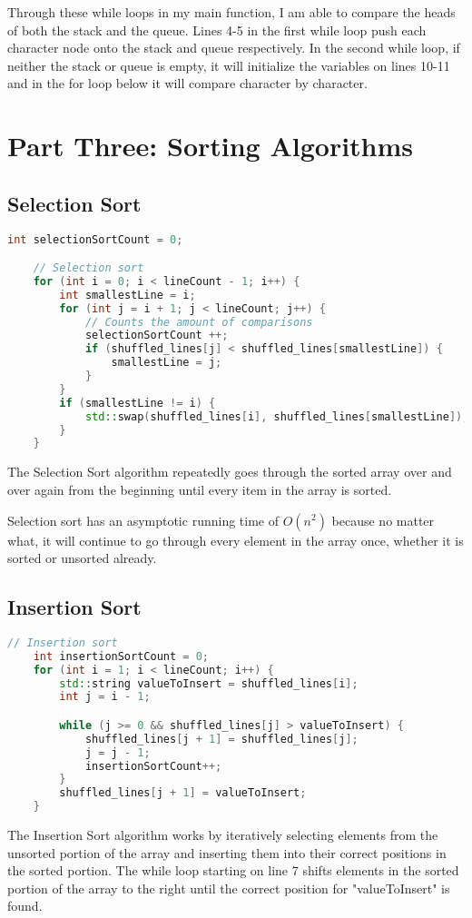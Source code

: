 \documentclass[letterpaper, 10pt,DIV=13]{scrartcl}
\numberwithin{equation}{section} %
\numberwithin{figure}{section} %
\numberwithin{table}{section} %
\begin{document}
Through these while loops in my main function, I am able to compare the heads of both the stack and the queue. Lines 4-5 in the first while loop push each character node onto the stack and queue respectively. In the second while loop, if neither the stack or queue is empty, it will initialize the variables on lines 10-11 and in the for loop below it will compare character by character.

\pagebreak

\section{Part Three: Sorting Algorithms}
\subsection{Selection Sort}
\begin{lstlisting}[language=c++, caption= Selection Sort Algorithm]
    int selectionSortCount = 0;

    // Selection sort
    for (int i = 0; i < lineCount - 1; i++) {
        int smallestLine = i;
        for (int j = i + 1; j < lineCount; j++) {
            // Counts the amount of comparisons
            selectionSortCount ++;
            if (shuffled_lines[j] < shuffled_lines[smallestLine]) {
                smallestLine = j;
            }
        }
        if (smallestLine != i) {
            std::swap(shuffled_lines[i], shuffled_lines[smallestLine]);
        }
    }
\end{lstlisting}
The Selection Sort algorithm repeatedly goes through the sorted array over and over again from the beginning until every item in the array is sorted.

Selection sort has an asymptotic running time of $O(n^2)$ because no matter what, it will continue to go through every element in the array once, whether it is sorted or unsorted already.
\subsection{Insertion Sort}
\begin{lstlisting}[language=c++, caption= Insertion Sort Algorithm]
    // Insertion sort
    int insertionSortCount = 0;
    for (int i = 1; i < lineCount; i++) {
        std::string valueToInsert = shuffled_lines[i];
        int j = i - 1;

        while (j >= 0 && shuffled_lines[j] > valueToInsert) {
            shuffled_lines[j + 1] = shuffled_lines[j];
            j = j - 1;
            insertionSortCount++;
        }
        shuffled_lines[j + 1] = valueToInsert;
    }
\end{lstlisting}
The Insertion Sort algorithm works by iteratively selecting elements from the unsorted portion of the array and inserting them into their correct positions in the sorted portion. The while loop starting on line 7 shifts elements in the sorted portion of the array to the right until the correct position for "valueToInsert" is found.
\end{document}
